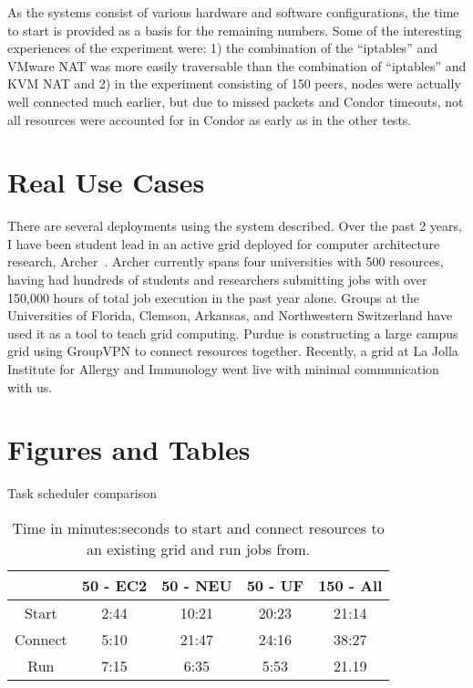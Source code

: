 As the systems consist of various hardware and software configurations, the
time to start is provided as a basis for the remaining numbers.  Some of the
interesting experiences of the experiment were:  1) the combination of the
``iptables'' and VMware NAT was more easily traversable than the combination
of ``iptables'' and KVM NAT and 2) in the experiment consisting of 150 peers,
nodes were actually well connected much earlier, but due to missed packets and
Condor timeouts, not all resources were accounted for in Condor as early as in
the other tests.

\section{Real Use Cases}
There are several deployments using the system described.  Over the past 2
years, I have been student lead in an active grid deployed for computer
architecture research, Archer~\cite{archer}.  Archer currently spans four
universities with 500 resources, having had hundreds of students and
researchers submitting jobs with over 150,000 hours of total job execution in
the past year alone.  Groups at the Universities of Florida, Clemson, Arkansas,
and Northwestern Switzerland have used it as a tool to teach grid computing.
Purdue is constructing a large campus grid using GroupVPN to connect resources
together.  Recently, a grid at La Jolla Institute for Allergy and Immunology
went live with minimal communication with us.

\section{Figures and Tables}

\begin{table}[ht]
\centering
\caption{Task scheduler comparison}
\label{tab:task_schedulers}
\end{table}

\begin{table}[ht]
\centering
\begin{tabular}{|c||c|c|c|c|} \hline
& 50 - EC2 & 50 - NEU & 50 - UF & 150 - All \\ \hline\hline
Start & 2:44 & 10:21 & 20:23 & 21:14 \\ \hline
Connect & 5:10 & 21:47 & 24:16 & 38:27\\ \hline
Run & 7:15 & 6:35 & 5:53 & 21.19 \\ \hline
\end{tabular}
\caption[Grid creation times]{Time in minutes:seconds to start and connect
resources to an existing grid and run jobs from.}
\label{fig:results}
\end{table}

